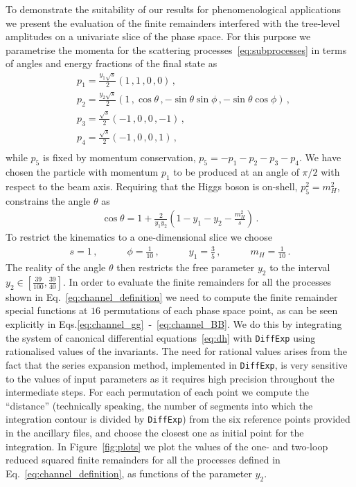 \documentclass[main.tex]{subfiles}
\begin{document}
To demonstrate the suitability of our results for phenomenological applications we present the evaluation of the finite remainders interfered with the tree-level amplitudes on a univariate slice of the phase space. For this purpose we parametrise the momenta for the scattering processes~\eqref{eq:subprocesses} in terms of angles and energy fractions of the final state as
\begin{equation} \label{eq:parametrisation}
\begin{aligned}
& p_1 = \frac{y_1 \sqrt{s}}{2} \left( 1\,, 1\,, 0\,, 0 \right) \,, \quad \\
& p_2 = \frac{y_2 \sqrt{s}}{2} \left( 1\,, \cos\theta\,, -\sin\theta \sin\phi \,, -\sin\theta \cos\phi \right) \,,  \\
& p_3 = \frac{\sqrt{s}}{2} \left(-1\,,0\,, 0 \,, -1 \right) \,,  \\
& p_4 = \frac{\sqrt{s}}{2} \left(-1\,,0\,, 0 \,, 1 \right) \,,  \\
\end{aligned}
\end{equation}
while $p_5$ is fixed by momentum conservation, $p_5 = -p_1-p_2-p_3-p_4$. We have chosen the particle with momentum $p_1$ to be produced at an angle of $\pi/2$ with respect to the beam axis.
Requiring that the Higgs boson is on-shell, $p_5^2 = m_H^2$, constrains the angle $\theta$ as
\begin{align}
\cos\theta = 1+\frac{2}{y_1 y_2}\left(1-y_1-y_2-\frac{m_H^2}{s} \right)\,.
\end{align}
To restrict the kinematics to a one-dimensional slice we choose
\begin{align} \label{eq:fixparameters}
s = 1 \,, \quad \qquad \phi = \frac{1}{10} \,, \quad \qquad y_1 = \frac{3}{5} \,, \quad \qquad m_H = \frac{1}{10} \,.
\end{align}
The reality of the angle $\theta$ then restricts the free parameter $y_2$ to the interval $y_2 \in
[\frac{39}{100},\frac{39}{40}]$. In order to evaluate the finite remainders for all the processes
shown in Eq.~\eqref{eq:channel_definition} we need to compute the finite remainder special functions
at $16$ permutations of each phase space point, as can be seen explicitly in
Eqs.\eqref{eq:channel_gg}~-~\eqref{eq:channel_BB}. We do this by integrating the system of canonical differential equations~\eqref{eq:dh} with \texttt{DiffExp} using rationalised values of the invariants. The need for rational values arises from the fact that the series expansion method, implemented in \texttt{DiffExp}, is very sensitive to the values of input parameters as it requires high precision throughout the intermediate steps. For each permutation of each point we compute the ``distance'' (technically speaking, the number of segments into which the integration contour is divided by \texttt{DiffExp}) from the six reference points provided in the ancillary files, and choose the closest one as initial point for the integration. In Figure~\ref{fig:plots} we plot the values of the one- and two-loop reduced squared finite remainders for all the processes defined in Eq.~\eqref{eq:channel_definition}, as functions of the parameter $y_2$.
\end{document}
